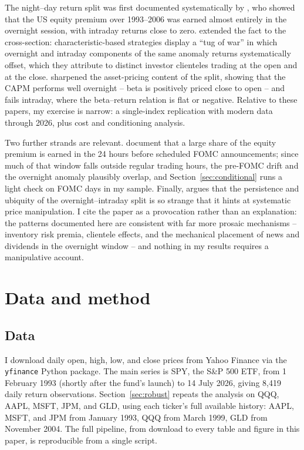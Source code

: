 \documentclass[11pt]{article}
\begin{document}
The night--day return split was first documented systematically by \citet{cooper2008}, who showed that the US equity premium over 1993--2006 was earned almost entirely in the overnight session, with intraday returns close to zero. \citet{lou2019} extended the fact to the cross-section: characteristic-based strategies display a ``tug of war'' in which overnight and intraday components of the same anomaly returns systematically offset, which they attribute to distinct investor clienteles trading at the open and at the close. \citet{hendershott2020} sharpened the asset-pricing content of the split, showing that the CAPM performs well overnight -- beta is positively priced close to open -- and fails intraday, where the beta--return relation is flat or negative. Relative to these papers, my exercise is narrow: a single-index replication with modern data through 2026, plus cost and conditioning analysis.

Two further strands are relevant. \citet{lucca2015} document that a large share of the equity premium is earned in the 24 hours before scheduled FOMC announcements; since much of that window falls outside regular trading hours, the pre-FOMC drift and the overnight anomaly plausibly overlap, and Section~\ref{sec:conditional} runs a light check on FOMC days in my sample. Finally, \citet{knuteson2020} argues that the persistence and ubiquity of the overnight--intraday split is so strange that it hints at systematic price manipulation. I cite the paper as a provocation rather than an explanation: the patterns documented here are consistent with far more prosaic mechanisms -- inventory risk premia, clientele effects, and the mechanical placement of news and dividends in the overnight window -- and nothing in my results requires a manipulative account.

\section{Data and method}
\label{sec:data}

\subsection{Data}

I download daily open, high, low, and close prices from Yahoo Finance via the \texttt{yfinance} Python package. The main series is SPY, the S\&P 500 ETF, from 1 February 1993 (shortly after the fund's launch) to 14 July 2026, giving 8,419 daily return observations. Section~\ref{sec:robust} repeats the analysis on QQQ, AAPL, MSFT, JPM, and GLD, using each ticker's full available history: AAPL, MSFT, and JPM from January 1993, QQQ from March 1999, GLD from November 2004. The full pipeline, from download to every table and figure in this paper, is reproducible from a single script.
\end{document}
